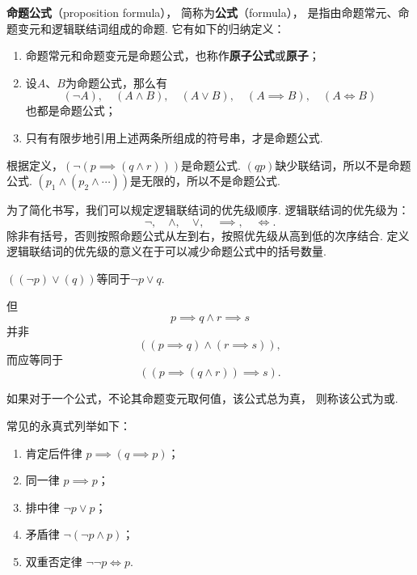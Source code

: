 \begin{definition}
\textbf{命题公式}（proposition formula），%
简称为\textbf{公式}（formula），%
是指由命题常元、命题变元和逻辑联结词组成的命题.
它有如下的归纳定义：
\begin{enumerate}
\item 命题常元和命题变元是命题公式，也称作\textbf{原子公式}或\textbf{原子}；
\item 设\(A\)、\(B\)为命题公式，那么有\[
(\neg A),\quad
(A \land B),\quad
(A \lor B),\quad
(A \implies B),\quad
(A \iff B)
\]也都是命题公式；
\item 只有有限步地引用上述两条所组成的符号串，才是命题公式.
\end{enumerate}
\end{definition}

\begin{example}
根据定义，\((\neg(p \implies (q \land r)))\)是命题公式.
\((qp)\)缺少联结词，所以不是命题公式.
\((p_1 \land (p_2 \land \dotsb))\)是无限的，所以不是命题公式.
\end{example}

为了简化书写，我们可以规定逻辑联结词的优先级顺序.
逻辑联结词的优先级为：\[
\neg,\quad \land,\quad \lor,\quad \implies,\quad \iff.
\]除非有括号，否则按照命题公式从左到右，按照优先级从高到低的次序结合.
定义逻辑联结词的优先级的意义在于可以减少命题公式中的括号数量.

\begin{example}
\(((\neg p) \lor (q))\)等同于\(\neg p \lor q\).

但\[
p \implies q \land r \implies s
\]并非\[
((p \implies q) \land (r \implies s)),
\]而应等同于\[
((p \implies (q \land r)) \implies s).
\]
\end{example}

\begin{definition}
如果对于一个公式，不论其命题变元取何值，该公式总为真，%
则称该公式为或.
\end{definition}

常见的永真式列举如下：\begin{enumerate}
\item 肯定后件律 \(p \implies (q \implies p)\)；
\item 同一律 \(p \implies p\)；
\item 排中律 \(\neg p \lor p\)；
\item 矛盾律 \(\neg(\neg p \land p)\)；
\item 双重否定律 \(\neg\neg p \iff p\).
\end{enumerate}



